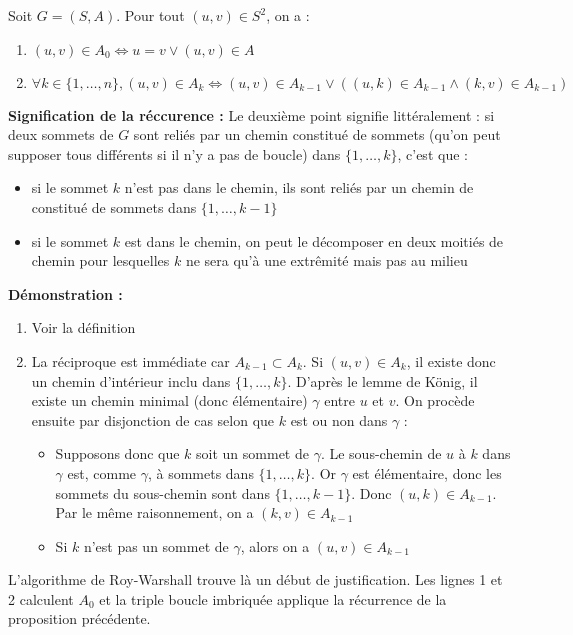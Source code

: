 \documentclass[../../../main.tex]{subfiles}
\begin{document}
 Soit $G = (S, A)$. Pour tout $(u, v)\in S^2$, on a :
\begin{enumerate}
	\item $(u, v)\in A_0\Leftrightarrow u = v\vee (u, v)\in A$
	\item $\forall k\in\{1, \dots, n\}, (u, v)\in A_k \Leftrightarrow (u, v)\in A_{k-1}\vee ((u, k)\in A_{k-1}\wedge (k, v)\in A_{k-1})$
\end{enumerate}
\textbf{Signification de la réccurence :} Le deuxième point signifie littéralement : si deux sommets de $G$ sont reliés par un chemin constitué de sommets (qu'on peut supposer tous différents si il n'y a pas de boucle) dans $\{1, \dots, k\}$, c'est que :
\begin{itemize}
	\item si le sommet $k$ n'est pas dans le chemin, ils sont reliés par un chemin de constitué de sommets dans $\{1, \dots, k-1\}$
	\item si le sommet $k$ est dans le chemin, on peut le décomposer en deux moitiés de chemin pour lesquelles $k$ ne sera qu'à une extrêmité mais pas au milieu
\end{itemize}
\textbf{Démonstration :}
\begin{enumerate}
	\item Voir la définition
	\item La réciproque est immédiate car $A_{k-1}\subset A_k$. Si $(u, v)\in A_k$, il existe donc un chemin d'intérieur inclu dans $\{1, \dots, k\}$. D'après le lemme de König, il existe un chemin minimal (donc élémentaire) $\gamma$ entre $u$ et $v$. \newline
	On procède ensuite par disjonction de cas selon que $k$ est ou non dans $\gamma$ :
	\begin{itemize}
		\item Supposons donc que $k$ soit un sommet de $\gamma$. Le sous-chemin de $u$ à $k$ dans $\gamma$ est, comme $\gamma$, à sommets dans $\{1, \dots, k\}$. Or $\gamma$ est élémentaire, donc les sommets du sous-chemin sont dans $\{1, \dots, k-1\}$. Donc $(u, k)\in A_{k-1}$. Par le même raisonnement, on a $(k, v)\in A_{k-1}$
		\item Si $k$ n'est pas un sommet de $\gamma$, alors on a $(u, v)\in A_{k-1}$
	\end{itemize}
\end{enumerate}
L'algorithme de Roy-Warshall trouve là un début de justification. Les lignes 1 et 2 calculent $A_0$ et la triple boucle imbriquée applique la récurrence de la proposition précédente.
\end{document}
